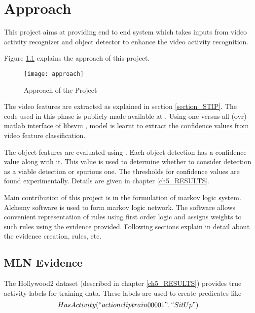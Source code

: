 \chapter{Approach}
\label{ch4_APPROACH}

This project aims at providing end to end system which takes inputs from
video activity recognizer and object detector to enhance the video activity recognition.

Figure \ref{fig:approach} explains the approach of this project.
\begin{figure}[H]
\begin{center}	
	\texttt{[image: approach]} 
\caption{Approach of the Project}
\label{fig:approach}
\end{center}
\end{figure}

The video features are extracted as explained in section \ref{section_STIP}.
The code used in this phase is publicly made available at \cite{stipCode}.
Using one versus all (ovr) matlab interface of libsvm \cite{libsvm}, model is learnt to extract the 
confidence values from video feature classification.

The object features are evaluated using \cite{voc-release4}. 
Each object detection has a confidence value along with it.
This value is used to determine whether to consider detection
as a viable detection or spurious one. The thresholds for confidence
values are found experimentally. Details are given in chapter \ref{ch5_RESULTS}.

Main contribution of this project is in the formulation of
markov logic system. Alchemy \cite{alchemy2.0} software is
used to form markov logic network. The software allows convenient
representation of rules using first order logic and assigns weights to
such rules using the evidence provided. Following sections explain in detail
about the evidence creation, rules, etc.

\section{MLN Evidence}
The Hollywood2 dataset \cite{hollywood2} (described in chapter \ref{ch5_RESULTS}) provides
true activity labels for training data. These labels are used to create predicates
like
\begin{equation}
	HasActivity( ``actioncliptrain00001", ``SitUp" )
\end{equation}

